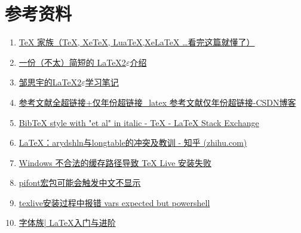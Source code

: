 \chapter*{参考资料}\label{chap:refinfor}
\begin{enumerate}[itemsep=1.5ex]
    \item \href{https://zhuanlan.zhihu.com/p/248669482}{TeX 家族（TeX, XeTeX, LuaTeX,XeLaTeX …看完这篇就懂了）}
    \item \href{http://mirrors.ctan.org/info/lshort/chinese/lshort-zh-cn.pdf}{一份（不太）简短的 \LaTeX{}2$\varepsilon$介绍}
    \item \href{https://github.com/zousiyu1995/Study-LaTeX}{邹思宇的\LaTeX{}2$\varepsilon$学习笔记}
    \item \href{https://blog.csdn.net/qq_36829039/article/details/123576507}{参考文献全超链接+仅年份超链接\_latex 参考文献仅年份超链接-CSDN博客}
    \item \href{https://tex.stackexchange.com/questions/532367/bibtex-style-with-et-al-in-italic}{BibTeX style with "et al" in italic - TeX - LaTeX Stack Exchange}
    \item \href{https://zhuanlan.zhihu.com/p/667681242}{LaTeX：arydshln与longtable的冲突及教训 - 知乎 (zhihu.com)}
    \item \href{https://syvshc.github.io/2021-04-07-illegal-temp-cause-tlinstall-failure/}{Windows 不合法的缓存路径导致 TeX Live 安装失败}
    \item \href{https://github.com/CTeX-org/ctex-kit/issues/688}{pifont宏包可能会触发中文不显示}
    \item \href{https://blog.csdn.net/qq_50698753/article/details/130475564}{texlive安装过程中报错 vars expected but powershell}
    \item \href{https://latex.lierhua.top/zh/docs/%E5%AD%97%E4%BD%93%E6%97%8F/}{字体族| \LaTeX{}入门与进阶}
\end{enumerate}